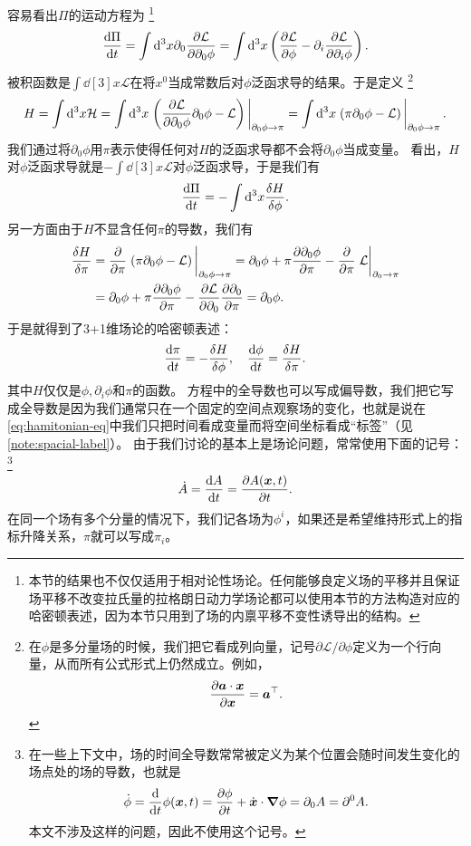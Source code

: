 \documentclass[UTF8, a4paper]{ctexart}
\begin{document}
容易看出$\Pi$的运动方程为%
\footnote{本节的结果也不仅仅适用于相对论性场论。任何能够良定义场的平移并且保证场平移不改变拉氏量的拉格朗日动力学场论都可以使用本节的方法构造对应的哈密顿表述，因为本节只用到了场的内禀平移不变性诱导出的结构。}
\[
    \dv{\Pi}{t} = \int \dd[3]x \partial_0 \pdv{\mathcal{L}}{\partial_0 \phi} = \int \dd[3]x \left( \pdv{\mathcal{L}}{\phi} - \partial_i \pdv{\mathcal{L}}{\partial_i \phi} \right).
\]
被积函数是$\int \dd[3]x \mathcal{L}$在将$x^0$当成常数后对$\phi$泛函求导的结果。于是定义%
\footnote{在$\phi$是多分量场的时候，我们把它看成列向量，记号$\partial \mathcal{L} / \partial \phi$定义为一个行向量，从而所有公式形式上仍然成立。例如，
\[
    \pdv{\vb*{a} \cdot \vb*{x}}{\vb*{x}} = \vb*{a}^\top.
\]
}%
\begin{equation}
    H = \int \dd[3]x \mathcal{H} 
    = \int \dd[3]x \eval{\left( \pdv{\mathcal{L}}{\partial_0 \phi} \partial_0 \phi - \mathcal{L} \right)}_{\partial_0 \phi \to \pi} 
    = \int \dd[3]x \eval{\left( \pi \partial_0 \phi - \mathcal{L} \right)}_{\partial_0 \phi \to \pi}.
    \label{eq:lagrangian-to-hamitonian}
\end{equation}
我们通过将$\partial_0 \phi$用$\pi$表示使得任何对$H$的泛函求导都不会将$\partial_0 \phi$当成变量。
看出，$H$对$\phi$泛函求导就是$-\int \dd[3]x \mathcal{L}$对$\phi$泛函求导，于是我们有
\[
    \dv{\Pi}{t} = - \int \dd[3]x \fdv{H}{\phi}.
\]
另一方面由于$H$不显含任何$\pi$的导数，我们有
\[
    \begin{aligned}
        \fdv{H}{\pi} &= \pdv{\pi} \eval{\left( \pi \partial_0 \phi - \mathcal{L} \right)}_{\partial_0 \phi \to \pi} 
        = \partial_0 \phi + \pi \pdv{\partial_0 \phi}{\pi} - \pdv{\pi} \eval{\mathcal{L}}_{\partial_0 \to \pi} \\
        &= \partial_0 \phi + \pi \pdv{\partial_0 \phi}{\pi} - \pdv{\mathcal{L}}{\partial_0} \pdv{\partial_0}{\pi} = \partial_0 \phi.
    \end{aligned}
\]
于是就得到了3+1维场论的哈密顿表述：
\begin{equation}
    \dv{\pi}{t} = - \fdv{H}{\phi}, \quad \dv{\phi}{t} = \fdv{H}{\pi}.
    \label{eq:hamitonian-eq}
\end{equation}
其中$H$仅仅是$\phi, \partial_i \phi$和$\pi$的函数。
方程中的全导数也可以写成偏导数，我们把它写成全导数是因为我们通常只在一个固定的空间点观察场的变化，也就是说在\eqref{eq:hamitonian-eq}中我们只把时间看成变量而将空间坐标看成“标签”（见\autoref{note:spacial-label}）。
由于我们讨论的基本上是场论问题，常常使用下面的记号：%
\footnote{在一些上下文中，场的时间全导数常常被定义为某个位置会随时间发生变化的场点处的场的导数，也就是
\[
    \dot{\phi} = \dv{t} \phi(\vb*{x}, t) = \pdv{\phi}{t} + \dot{\vb*{x}} \cdot \grad{\phi} = \partial_0 A = \partial^0 A.
\]
本文不涉及这样的问题，因此不使用这个记号。
}%
\[
    \dot{A} = \dv{A}{t} = \pdv{A(\vb*{x}, t)}{t}.
\]
在同一个场有多个分量的情况下，我们记各场为$\phi^i$，如果还是希望维持形式上的指标升降关系，$\pi$就可以写成$\pi_i$。
\end{document}
